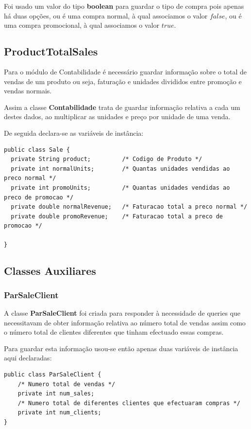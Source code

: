 \documentclass[10pt] {article}
\begin{document}
Foi usado um valor do tipo \textbf{boolean} para guardar o tipo de compra pois apenas há duas opções, ou é uma compra normal, à qual associamos o valor $false$, ou é uma compra promocional, à qual associamos o valor $true$.

\subsection{ProductTotalSales}

Para o módulo de Contabilidade é necessário guardar informação sobre o total de vendas de um produto ou seja, faturação e unidades divididos entre promoção e vendas normais.

Assim a classe \textbf{Contabilidade} trata de guardar informação relativa a cada um destes dados, ao multiplicar as unidades e preço por unidade de uma venda.

De seguida declara-se as variáveis de instância:

\begin{lstlisting}
public class Sale {
  private String product;         /* Codigo de Produto */
  private int normalUnits;        /* Quantas unidades vendidas ao preco normal */
  private int promoUnits;         /* Quantas unidades vendidas ao preco de promocao */
  private double normalRevenue;   /* Faturacao total a preco normal */
  private double promoRevenue;    /* Faturacao total a preco de promocao */

}
\end{lstlisting}

\subsection{Classes Auxiliares}
\subsubsection{ParSaleClient}

A classe \textbf{ParSaleClient} foi criada para responder à necessidade de queries que necessitavam de obter informação relativa ao número total de vendas assim como o número total de clientes diferentes que tinham efectuado essas compras.

Para guardar esta informação usou-se então apenas duas variáveis de instância aqui declaradas:

\begin{lstlisting}
public class ParSaleClient {
	/* Numero total de vendas */
	private int num_sales;
	/* Numero total de diferentes clientes que efectuaram compras */
	private int num_clients;
}
\end{lstlisting}
\end{document}
